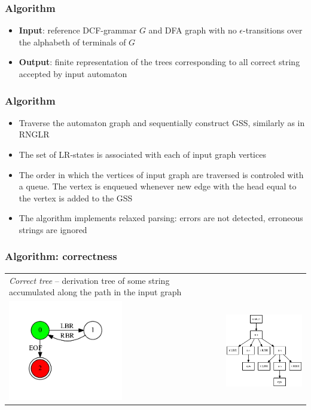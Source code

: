 \documentclass{beamer}
\begin{document}
\begin{frame}
  \transwipe[direction=90]
  \frametitle{Algorithm}
  \begin{itemize}
    \item \textbf{Input}: reference DCF-grammar $G$ and DFA graph with no 
$\epsilon$-transitions over the alphabeth of terminals of $G$
    \item \textbf{Output}: finite representation of the trees corresponding to 
all correct string accepted by input automaton
  \end{itemize}
\end{frame}


\begin{frame}
  \transwipe[direction=90]
  \frametitle{Algorithm}
  \begin{itemize}
    \item Traverse the automaton graph and sequentially construct GSS, similarly as in RNGLR
    \item The set of LR-states is associated with each of input graph vertices
    \item The order in which the vertices of input graph are traversed is 
controled with a queue. The vertex is enqueued whenever new edge with the head 
equal to the vertex is added to the GSS
  \end{itemize}
  \begin{itemize}
    \item The algorithm implements relaxed parsing: errors are not detected, 
erroneous strings are ignored
  \end{itemize}

\end{frame}

\begin{frame}
\transwipe[direction=90]
\frametitle{Algorithm: correctness}
\begin{tabular}{p{5.3cm} p{6.7cm}}
\emph{Correct tree} -- derivation tree of some string accumulated along the 
path in the input graph
&
\\
\includegraphics[width=5cm]{pictures/in3.pdf}
&
\includegraphics[width=6cm]{pictures/sppf2.eps}
\end{tabular}
\end{frame}
\end{document}
